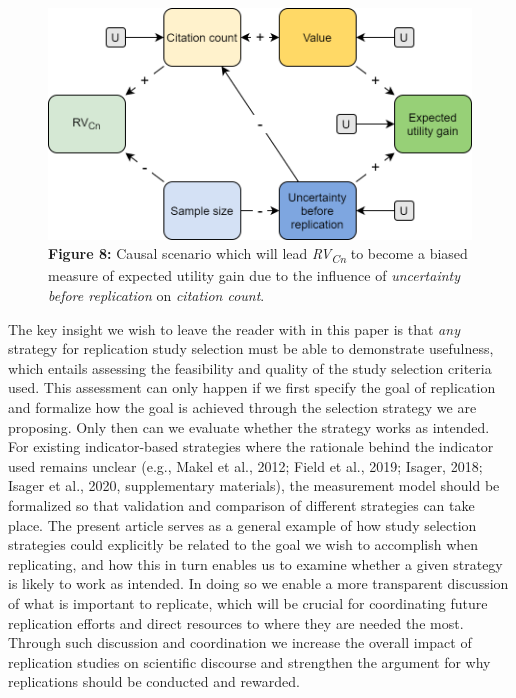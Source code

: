 \documentclass[
  english,
  jou,floatsintext]{apa6}
\begin{document}
\begin{figure}
\centering
\includegraphics{figure_8.png}
\caption{\textbf{Figure 8:} Causal scenario which will lead \emph{RV\textsubscript{Cn}} to become a biased measure of expected utility gain due to the influence of \emph{uncertainty before replication} on \emph{citation count}. \label{fig:8}}
\end{figure}

The key insight we wish to leave the reader with in this paper is that \emph{any} strategy for replication study selection must be able to demonstrate usefulness, which entails assessing the feasibility and quality of the study selection criteria used. This assessment can only happen if we first specify the goal of replication and formalize how the goal is achieved through the selection strategy we are proposing. Only then can we evaluate whether the strategy works as intended. For existing indicator-based strategies where the rationale behind the indicator used remains unclear (e.g., Makel et al., 2012; Field et al., 2019; Isager, 2018; Isager et al., 2020, supplementary materials), the measurement model should be formalized so that validation and comparison of different strategies can take place. The present article serves as a general example of how study selection strategies could explicitly be related to the goal we wish to accomplish when replicating, and how this in turn enables us to examine whether a given strategy is likely to work as intended. In doing so we enable a more transparent discussion of what is important to replicate, which will be crucial for coordinating future replication efforts and direct resources to where they are needed the most. Through such discussion and coordination we increase the overall impact of replication studies on scientific discourse and strengthen the argument for why replications should be conducted and rewarded.
\end{document}
